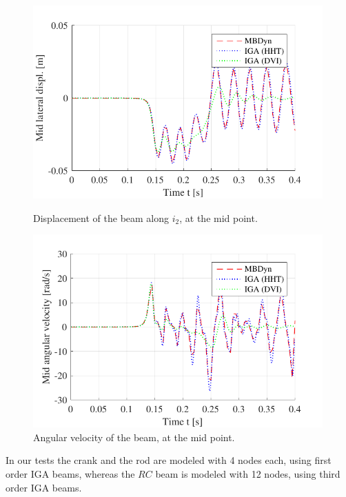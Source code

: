 \documentclass[review]{elsarticle}
\begin{document}
\begin{figure}%
  \begin{minipage}[b]{0.48\linewidth}
    \centering
    \includegraphics[width=0.99\textwidth]{benchmark_buckling/benchmark_buckling_disp.pdf}
    \caption{Displacement of the beam along $i_2$, at the mid point.}
    \label{figB2disp}
 \end{minipage}
 \hspace{0.4cm}
 \begin{minipage}[b]{0.48\linewidth}
    \centering
    \includegraphics[width=0.99\textwidth]{benchmark_buckling/benchmark_buckling_vel.pdf}
    \caption{Angular velocity of the beam, at the mid point.}
    \label{figB2wvel}
  \end{minipage}
\end{figure}

In our tests the crank and the rod are modeled with 4 nodes each, using first order IGA beams, whereas the $RC$ beam is modeled with 12 nodes, using third order IGA beams.
\end{document}
